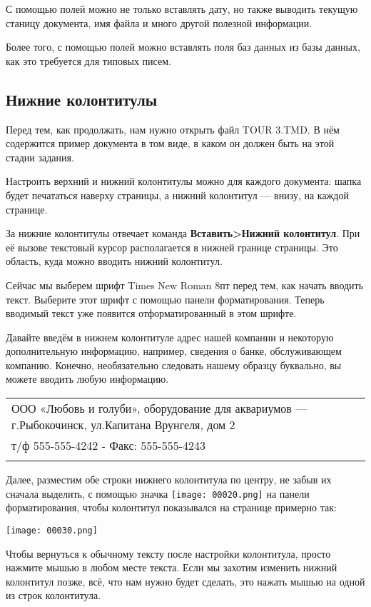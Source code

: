 \documentclass[a4paper,10pt]{article}
\begin{document}
С помощью полей можно не только вставлять дату, но также выводить текущую станицу документа, имя файла и много другой полезной информации.

Более того, с помощью полей можно вставлять поля баз данных из базы данных, как это требуется для типовых писем.

\subsection{Нижние колонтитулы}
Перед тем, как продолжать,  нам нужно открыть файл TOUR 3.TMD. В нём содержится пример документа в том виде, в каком он должен быть на этой стадии задания.

Настроить верхний и нижний колонтитулы можно для каждого документа: шапка будет печататься наверху страницы, а нижний колонтитул — внизу, на каждой странице. 

За нижние колонтитулы отвечает команда \textbf{Вставить>Нижний колонтитул}. При её вызове текстовый курсор располагается в нижней границе страницы. Это область, куда можно вводить нижний колонтитул.

Сейчас мы выберем шрифт Times New Roman 8пт перед тем, как начать вводить текст. Выберите этот шрифт с помощью панели форматирования. Теперь вводимый текст уже появится отформатированный в этом шрифте.

Давайте введём в нижнем колонтитуле адрес нашей компании и некоторую дополнительную информацию, например, сведения о банке, обслуживающем компанию. Конечно, необязательно следовать нашему образцу буквально, вы можете вводить любую информацию.

\begin{center}
\begin{tabular}{ | m{17cm} | }
\hline
ООО «Любовь и голуби»,  оборудование для аквариумов — г.Рыбокочинск, ул.Капитана Врунгеля, дом 2\\
т/ф 555-555-4242 - Факс: 555-555-4243\keys{\return}\\
\\
\hline
\end{tabular}
\end{center}

Далее, разместим обе строки нижнего колонтитула по центру, не забыв их сначала выделить, с помощью значка \texttt{[image: 00020.png]} на панели форматирования, чтобы колонтитул показывался на странице примерно так:

\texttt{[image: 00030.png]}

Чтобы вернуться к обычному тексту после настройки колонтитула, просто нажмите мышью в любом месте текста. Если мы захотим изменить нижний колонтитул позже, всё, что нам нужно будет сделать, это нажать мышью на одной из строк колонтитула.
\end{document}
